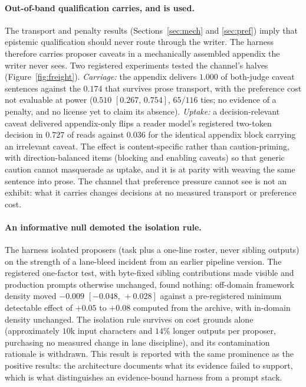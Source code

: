 \documentclass[11pt]{article}
\newcommand{\ci}[2]{\ensuremath{[#1,\,#2]}}
\begin{document}
\paragraph{Out-of-band qualification carries, and is used.} The
transport and penalty results (Sections~\ref{sec:mech} and
\ref{sec:pref}) imply that epistemic qualification should never route
through the writer. The harness therefore carries proposer caveats in a
mechanically assembled appendix the writer never sees. Two registered
experiments tested the channel's halves (Figure~\ref{fig:freight}).
\emph{Carriage:} the appendix delivers $1.000$ of both-judge caveat
sentences against the $0.174$ that survives prose transport, with the
preference cost not evaluable at power ($0.510$ \ci{0.267}{0.754},
$65/116$ ties; no evidence of a penalty, and no license yet to claim
its absence). \emph{Uptake:} a decision-relevant caveat delivered
appendix-only flips a reader model's registered two-token decision in
$0.727$ of reads against $0.036$ for the identical appendix block
carrying an irrelevant caveat. The effect is content-specific rather
than caution-priming, with direction-balanced items (blocking and
enabling caveats) so that generic caution cannot masquerade as uptake,
and it is at parity with weaving the same sentence into prose. The
channel that preference pressure cannot see is not an exhibit: what it
carries changes decisions at no measured transport or preference cost.

\paragraph{An informative null demoted the isolation rule.} The harness
isolated proposers (task plus a one-line roster, never sibling outputs)
on the strength of a lane-bleed incident from an earlier pipeline
version. The registered one-factor test, with byte-fixed sibling
contributions made visible and production prompts otherwise unchanged,
found nothing: off-domain framework density moved $-0.009$
\ci{-0.048}{+0.028} against a pre-registered minimum detectable effect
of $+0.05$ to $+0.08$ computed from the archive, with in-domain density
unchanged. The isolation rule survives on cost grounds alone
(approximately $10$k input characters and $14\%$ longer outputs per
proposer, purchasing no measured change in lane discipline), and its
contamination rationale is withdrawn. This result is reported with the
same prominence as the positive results: the architecture documents
what its evidence failed to support, which is what distinguishes an
evidence-bound harness from a prompt stack.
\end{document}
